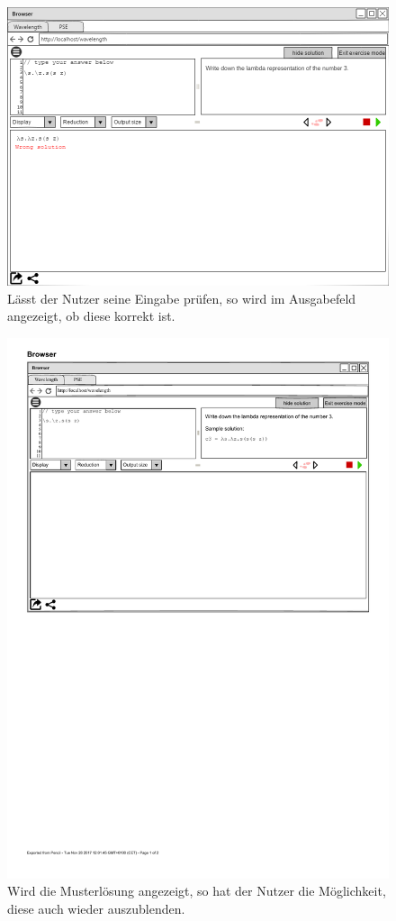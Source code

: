 \documentclass[parskip=full,11pt,twoside]{scrartcl}
\begin{document}
\begin{figure}[H]
	\centering
	\includegraphics[width=\textwidth]{img/exercise_mode_solution_check.png}
	\caption{\label{fig:solutionCheck}Lässt der Nutzer seine Eingabe prüfen, so wird im Ausgabefeld angezeigt, ob diese korrekt ist.}
\end{figure}


\begin{figure}[H]
	\centering
	\includegraphics[width=\textwidth]{img/exerciseModeSolution}
	\caption{\label{fig:showSolution}Wird die Musterlösung angezeigt, so hat der Nutzer die Möglichkeit, diese auch wieder auszublenden.}
\end{figure}
\end{document}
